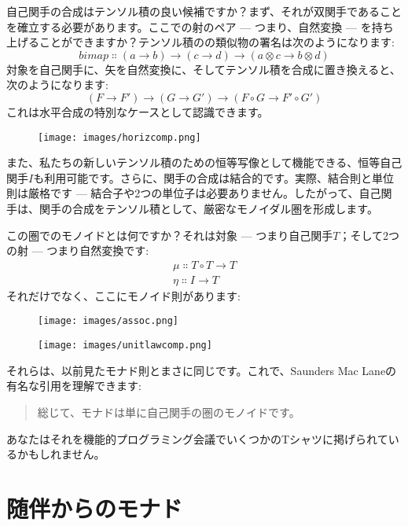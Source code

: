 自己関手の合成はテンソル積の良い候補ですか？まず、それが双関手であることを確立する必要があります。ここでの射のペア --- つまり、自然変換 --- を持ち上げることができますか？テンソル積のの類似物の署名は次のようになります: 
\[\mathit{bimap} \Colon (a \to b) \to (c \to d) \to (a \otimes c \to b \otimes d)\]
対象を自己関手に、矢を自然変換に、そしてテンソル積を合成に置き換えると、次のようになります: 
\[(F \to F') \to (G \to G') \to (F \circ G \to F' \circ G')\]
これは水平合成の特別なケースとして認識できます。

\begin{figure}[H]
  \centering
  \texttt{[image: images/horizcomp.png]}
\end{figure}

\noindent
また、私たちの新しいテンソル積のための恒等写像として機能できる、恒等自己関手$I$も利用可能です。さらに、関手の合成は結合的です。実際、結合則と単位則は厳格です --- 結合子や2つの単位子は必要ありません。したがって、自己関手は、関手の合成をテンソル積として、厳密なモノイダル圏を形成します。

この圏でのモノイドとは何ですか？それは対象 --- つまり自己関手$T$；そして2つの射 --- つまり自然変換です: 
\begin{gather*}
  \mu \Colon T \circ T \to T \\
  \eta \Colon I \to T
\end{gather*}
それだけでなく、ここにモノイド則があります: 

\begin{figure}[H]
  \centering
  \texttt{[image: images/assoc.png]}
\end{figure}

\begin{figure}[H]
  \centering
  \texttt{[image: images/unitlawcomp.png]}
\end{figure}

\noindent
それらは、以前見たモナド則とまさに同じです。これで、Saunders Mac Laneの有名な引用を理解できます: 

\begin{quote}
  総じて、モナドは単に自己関手の圏のモノイドです。
\end{quote}
あなたはそれを機能的プログラミング会議でいくつかのTシャツに掲げられているかもしれません。

\section{随伴からのモナド}

